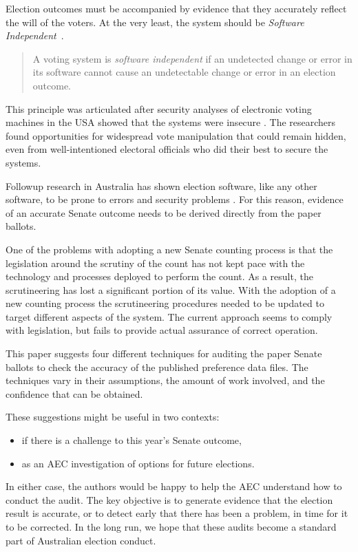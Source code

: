 \documentclass[10pt,a4paper]{article}
\begin{document}
Election outcomes must be accompanied by evidence that they accurately reflect the will of the voters. 
At the very least, the system should be \emph{Software Independent}~\cite{rivest2008notion}.
\begin{quote}
A voting system is \emph{software independent} if an undetected change or error in its software cannot cause an undetectable change or error in an election outcome.
\end{quote}

This principle was articulated after security analyses of electronic voting machines in the USA showed that the systems were insecure \cite{feldman2006security, kohno2004analysis, butler2008systemic, CAttbr}. The researchers found opportunities for widespread vote manipulation that could remain hidden, even from well-intentioned electoral officials who did their best to secure the systems.

Followup research in Australia  has shown election software, like any other software, to be prone to errors and security problems \cite{halderman2015new, CountingBug}.  For this reason, evidence of an accurate Senate outcome needs to be derived directly from the paper ballots.  

One of the problems with adopting a new Senate counting process is that the legislation around the scrutiny of the count has not kept pace with the technology and processes deployed to perform the count. As a result, the scrutineering has lost a significant portion of its value. With the adoption of a new counting process the scrutineering procedures needed to be updated to target different aspects of the system. The current approach seems to  comply with legislation, but fails to provide actual assurance of correct operation. 

This paper suggests four different techniques for auditing the paper Senate ballots to check the accuracy of the published preference data files.  The techniques vary in their assumptions, the amount of work involved, and the confidence that can be obtained.

These suggestions might be useful in two contexts:
\begin{itemize}
\item if there is a challenge to this year's Senate outcome, 
\item as an AEC investigation of options for future elections.
\end{itemize}

In either case, the authors would be happy to help the AEC understand how to conduct the audit.  The key objective is to generate evidence that the election result is accurate, or to detect early that there has been a problem, in time for it to be corrected.  In the long run, we hope that these audits become a standard part of Australian election conduct.
\end{document}
